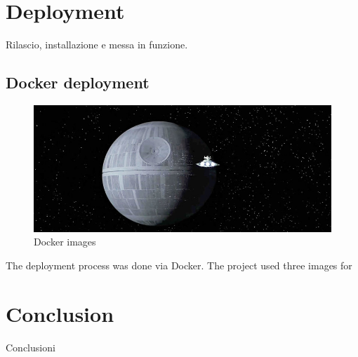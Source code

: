 \documentclass[multi, tikz]{article}
\begin{document}
\section{Deployment}
Rilascio, installazione e messa in funzione.
\subsection{Docker deployment}
\begin{figure}[h!]
  \centering
  \includegraphics[scale=0.44]{deathStar2.jpg}
  \caption{Docker images}
  \label{fig:deathstar}
\end{figure}

The deployment process was done via Docker. The project used three images for

\section{Conclusion}
Conclusioni



\end{document}
